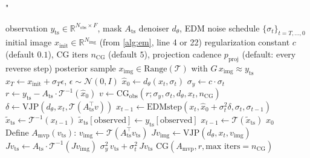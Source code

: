 "\documentclass{article}
\theoremstyle{plain}
\theoremstyle{definition}
\theoremstyle{remark}
\newcommand{\tsimg}{\mathcal{T}}
\newcommand{\imgts}{\mathcal{T}^{-1}}
\newcommand{\lmmps}{L\mbox{-}\textsc{mmps}}
\newcommand{\Nimg}{N_{\mathrm{img}}}
\newcommand{\Nobs}{N_{\mathrm{obs}}}
\newcommand{\Ats}{A_{\mathrm{ts}}}
\newcommand{\yts}{y_{\mathrm{ts}}}
\newcommand{\ximg}{x_{\mathrm{img}}}
\begin{document}
\begin{algorithm}[h]
\caption{$\lmmps$ E-step (single sample)}
\label{alg:estep}
\begin{algorithmic}[1]
\Require observation $\yts \in \mathbb{R}^{\Nobs \times F}$, mask $\Ats$
\Require denoiser $d_\theta$, EDM noise schedule $\{\sigma_t\}_{t = T, \ldots, 0}$
\Require initial image $x_{\mathrm{init}} \in \mathbb{R}^{\Nimg}$ (from \cref{alg:em}, line 4 or 22)
\Require regularization constant $c$ (default $0.1$), CG iters $n_{\mathrm{CG}}$ (default $5$), projection cadence $p_{\mathrm{proj}}$ (default: every reverse step)
\Ensure posterior sample $\ximg \in \mathrm{Range}(\tsimg)$ with $G\,\ximg \approx \yts$
\State $x_T \gets x_{\mathrm{init}} + \sigma_T \epsilon$, \quad $\epsilon \sim \mathcal{N}(0, I)$
  \State $\hat{x}_0 \gets d_\theta(x_t, \sigma_t)$ 
  \State $\sigma_y \gets c \cdot \sigma_t$ 
  \State $r \gets \yts - \Ats \cdot \imgts(\hat{x}_0)$ 
  \State $v \gets \mathrm{CG}_{\mathrm{obs}}(r; \sigma_y, \sigma_t, d_\theta, x_t, n_{\mathrm{CG}})$ \Comment{runs in $\mathbb{R}^{\Nobs \times F}$}
  \State $\delta \gets \mathrm{VJP}(d_\theta, x_t, \tsimg(\Ats^\top v))$ 
  \State $x_{t-1} \gets \mathrm{EDMstep}(x_t, \hat{x}_0 + \sigma_t^2 \delta, \sigma_t, \sigma_{t-1})$
   
    \State $\tilde{x}_{\mathrm{ts}} \gets \imgts(x_{t-1})$
    \State $\tilde{x}_{\mathrm{ts}}[\mathrm{observed}] \gets \yts[\mathrm{observed}]$ 
    \State $x_{t-1} \gets \tsimg(\tilde{x}_{\mathrm{ts}})$
  \EndIf
\EndFor
\State \Return $x_0$
\\
  \State Define $A_{\mathrm{mvp}}(v_{\mathrm{ts}})$:
  \State \quad $v_{\mathrm{img}} \gets \tsimg(\Ats^\top v_{\mathrm{ts}})$ 
  \State \quad $J v_{\mathrm{img}} \gets \mathrm{VJP}(d_\theta, x_t, v_{\mathrm{img}})$ 
  \State \quad $J v_{\mathrm{ts}} \gets \Ats \cdot \imgts(J v_{\mathrm{img}})$ 
  \State \quad \Return $\sigma_y^2\, v_{\mathrm{ts}} + \sigma_t^2\, J v_{\mathrm{ts}}$
  \State \Return $\mathrm{CG}(A_{\mathrm{mvp}}, r, \text{max iters} = n_{\mathrm{CG}})$
\EndFunction
\end{algorithmic}
\end{algorithm}
\end{document}

